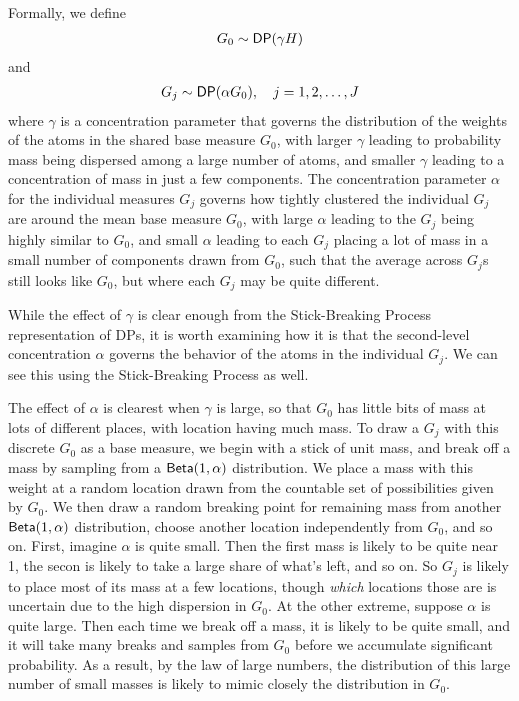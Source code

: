 Formally, we define
\begin{align}
  G_0 \sim \mathsf{DP}(\gamma H)
\end{align}
and
\begin{align}
  G_j \sim \mathsf{DP}(\alpha G_0), \quad j = 1, 2, \dots, J
\end{align}
where $\gamma$ is a concentration parameter that governs the
distribution of the weights of the atoms in the shared base measure
$G_0$, with larger $\gamma$ leading to probability mass being
dispersed among a large number of atoms, and smaller $\gamma$ leading
to a concentration of mass in just a few components.  The
concentration parameter $\alpha$ for the individual measures $G_j$
governs how tightly clustered the individual $G_j$ are around the mean
base measure $G_0$, with large $\alpha$ leading to the $G_j$ being
highly similar to $G_0$, and small $\alpha$ leading to each $G_j$
placing a lot of mass in a small number of components drawn from
$G_0$, such that the average across $G_j$s still looks like $G_0$, 
but where each $G_j$ may be quite different.

While the effect of $\gamma$ is clear enough from the Stick-Breaking
Process representation of DPs, it is worth examining how it is that
the second-level concentration $\alpha$ governs the behavior of the
atoms in the individual $G_j$.  We can see this using the
Stick-Breaking Process as well.

The effect of $\alpha$ is clearest when $\gamma$ is large, so that
$G_0$ has little bits of mass at lots of different places, with
location having much mass.  To draw a $G_j$ with this discrete $G_0$ 
as a base measure, we begin with a stick of unit mass, and break off a
mass by sampling from a
$\mathsf{Beta}(1,\alpha)$ distribution.  We place a mass with this weight at
a random location drawn from the countable set of possibilities given
by $G_0$.  We then draw a random breaking point for remaining mass 
from another $\mathsf{Beta}(1,\alpha)$ distribution, choose another location independently
from $G_0$, and so on.  First, imagine $\alpha$ is quite small.  Then
the first mass is likely to be quite near 1, the secon is likely to
take a large share of what's left, and so on.  So $G_j$ is likely to
place most of its mass at a few locations, though {\em which}
locations those are is uncertain due to the high dispersion in $G_0$.
At the other extreme, suppose $\alpha$ is quite large.  Then each time
we break off a mass, it is likely to be quite small, and it will take
many breaks and samples from $G_0$ before we accumulate significant
probability.  As a result, by the law of large numbers, 
the distribution of this large number of small masses is likely to
mimic closely the distribution in $G_0$.

